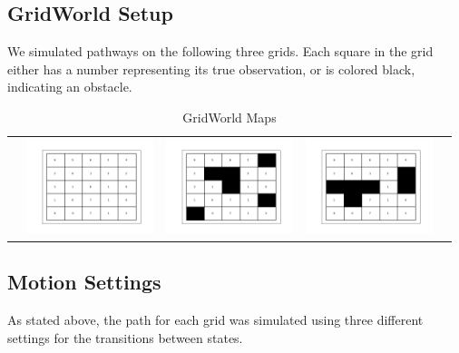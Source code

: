 \documentclass{article}
\begin{document}
\subsection{GridWorld Setup}

We simulated pathways on the following three grids. Each square in the grid either has a number representing its true observation, or is colored black, indicating an obstacle.

\newcommand{\addmapa}{\includegraphics[width=10em]{data/Model1/5x5;4;free.png}}
\newcommand{\addmapb}{\includegraphics[width=10em]{data/Model2/5x5;4;6box.png}}
\newcommand{\addmapc}{\includegraphics[width=10em]{data/Model3/5x5;4;6sep.png}}
\begin{table}[H]
\sffamily
\centering
\begin{tabular}{l*4{C}@{}}
& \addmapa & \addmapb & \addmapc \\
\end{tabular}
\caption{GridWorld Maps}
\end{table}

\subsection{Motion Settings}

As stated above, the path for each grid was simulated using three different settings for the transitions between states.
\end{document}
